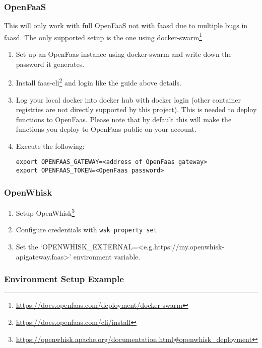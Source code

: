\documentclass[../main.tex]{subfiles}
\begin{document}
\subsubsection{OpenFaaS}\label{sec:providersetupopenfaas}
This will only work with full OpenFaaS not with faasd due to multiple bugs in faasd.
The only supported setup is the one using docker-swarm\footnote{\url{https://docs.openfaas.com/deployment/docker-swarm}}
\begin{enumerate}
\item Set up an OpenFaas instance using docker-swarm and write down the password it generates.
\item Install faas-cli\footnote{\url{https://docs.openfaas.com/cli/install}} and login like the guide above details.
\item Log your local docker into docker hub with docker login (other container registries are not directly supported by this project).
This is needed to deploy functions to OpenFaas. Please note that by default this will make the functions you deploy to OpenFaas public on your account.
\item Execute the following: 
  \begin{tcolorbox}
    \texttt{export OPENFAAS\_GATEWAY=<address of OpenFaas gateway>}\\
    \texttt{export OPENFAAS\_TOKEN=<OpenFaas password>}\\
  \end{tcolorbox}
\end{enumerate}

\subsubsection{OpenWhisk}\label{sec:providersetupopenwhisk}

\begin{enumerate}
\item Setup OpenWhisk\footnote{\url{https://openwhisk.apache.org/documentation.html\#openwhisk\_deployment}}
\item Configure credentials with \texttt{wsk property set}
\item Set the `OPENWHISK\_EXTERNAL=<e.g.\@ https://my.openwhisk-apigateway.faas>' environment variable.
\end{enumerate}

\subsubsection{Environment Setup Example}\label{sec:providersetupenv}
\end{document}
